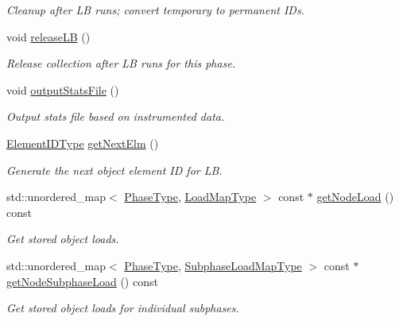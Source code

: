\begin{DoxyCompactItemize}
\begin{DoxyCompactList}\small\item\em Cleanup after LB runs; convert temporary to permanent I\+Ds. \end{DoxyCompactList}\item 
void \hyperlink{structvt_1_1vrt_1_1collection_1_1balance_1_1_node_stats_a517e67b5ada69873ab40d5f6e007a818}{release\+LB} ()
\begin{DoxyCompactList}\small\item\em Release collection after LB runs for this phase. \end{DoxyCompactList}\item 
void \hyperlink{structvt_1_1vrt_1_1collection_1_1balance_1_1_node_stats_ad9b5178c0d9570f57a255fdda5ccb0ca}{output\+Stats\+File} ()
\begin{DoxyCompactList}\small\item\em Output stats file based on instrumented data. \end{DoxyCompactList}\item 
\hyperlink{namespacevt_1_1vrt_1_1collection_1_1balance_a14c8d2c972f2913aa3f1636e5be0a120}{Element\+I\+D\+Type} \hyperlink{structvt_1_1vrt_1_1collection_1_1balance_1_1_node_stats_ac1b800713117d8f017746985a66dfbd2}{get\+Next\+Elm} ()
\begin{DoxyCompactList}\small\item\em Generate the next object element ID for LB. \end{DoxyCompactList}\item 
std\+::unordered\+\_\+map$<$ \hyperlink{namespacevt_a46ce6733d5cdbd735d561b7b4029f6d7}{Phase\+Type}, \hyperlink{namespacevt_1_1vrt_1_1collection_1_1balance_a45306ee4bf38fe3fb586d1ee2fa3d147}{Load\+Map\+Type} $>$ const  $\ast$ \hyperlink{structvt_1_1vrt_1_1collection_1_1balance_1_1_node_stats_a5b34d26f9e10f7ff3ceb92b95f0ed2f6}{get\+Node\+Load} () const
\begin{DoxyCompactList}\small\item\em Get stored object loads. \end{DoxyCompactList}\item 
std\+::unordered\+\_\+map$<$ \hyperlink{namespacevt_a46ce6733d5cdbd735d561b7b4029f6d7}{Phase\+Type}, \hyperlink{namespacevt_1_1vrt_1_1collection_1_1balance_a3d91523158c1025b7b665240072f3b7e}{Subphase\+Load\+Map\+Type} $>$ const  $\ast$ \hyperlink{structvt_1_1vrt_1_1collection_1_1balance_1_1_node_stats_a24660f52ff5e6a734a443ebbd1852519}{get\+Node\+Subphase\+Load} () const
\begin{DoxyCompactList}\small\item\em Get stored object loads for individual subphases. \end{DoxyCompactList}\item 

\end{DoxyCompactItemize}
